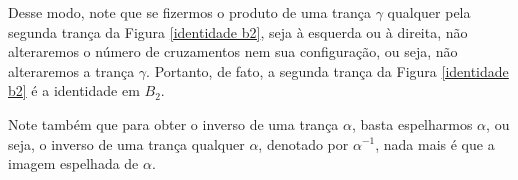 	\par\vspace{0.3cm} Desse modo, note que se fizermos o produto de uma trança $\gamma$ qualquer pela segunda trança da Figura \eqref{identidade b2}, seja à esquerda ou à direita, não alteraremos o número de cruzamentos nem sua configuração, ou seja, não alteraremos a trança $\gamma$. Portanto, de fato, a segunda trança da Figura \eqref{identidade b2} é a identidade em $B_2$.
	
	\par\vspace{0.3cm} Note também que para obter o inverso de uma trança $\alpha$, basta espelharmos $\alpha$, ou seja, o inverso de uma trança qualquer $\alpha$, denotado por $\alpha^{-1}$, nada mais é que a imagem espelhada de $\alpha$.   
	
	
	
	
	
	
	
	
	\par\vspace{0.3cm} 
	
